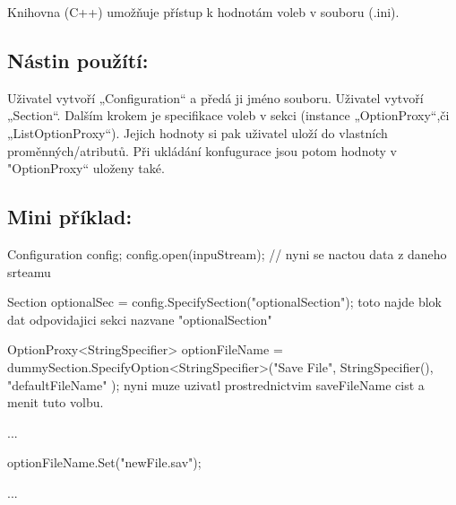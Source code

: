 Knihovna (C++) umožňuje přístup k hodnotám voleb v souboru (.ini).

\subsection*{Nástin použítí\+:}

Uživatel vytvoří „\+Configuration“ a předá ji jméno souboru. Uživatel vytvoří „\+Section“. Dalším krokem je specifikace voleb v sekci (instance „\+Option\+Proxy“,či „\+List\+Option\+Proxy“). Jejich hodnoty si pak uživatel uloží do vlastních proměnných/atributů. Při ukládání konfugurace jsou potom hodnoty v "Option\+Proxy“ uloženy také.

\subsection*{Mini příklad\+:}



 
\begin{DoxyPre}{\ttfamily 
Configuration config; 
config.open(inpuStream); // nyni se nactou data z daneho srteamu}\end{DoxyPre}



\begin{DoxyPre}{\ttfamily Section optionalSec = config.SpecifySection("optionalSection"); 
toto najde blok dat odpovidajici sekci nazvane "optionalSection"}\end{DoxyPre}



\begin{DoxyPre}{\ttfamily OptionProxy<StringSpecifier> optionFileName =  
            dummySection.SpecifyOption<StringSpecifier>("Save File", StringSpecifier(), "defaultFileName" );
nyni muze uzivatl prostrednictvim saveFileName cist a menit tuto volbu.}\end{DoxyPre}



\begin{DoxyPre}{\ttfamily ...}\end{DoxyPre}



\begin{DoxyPre}{\ttfamily optionFileName.Set("newFile.sav");}\end{DoxyPre}



\begin{DoxyPre}{\ttfamily ...}\end{DoxyPre}



